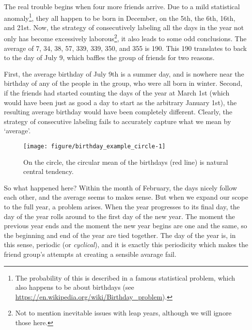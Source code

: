 \documentclass[12pt, a4paper]{book}\usepackage[]{graphicx}\usepackage[]{color}
\makeatletter
\def\maxwidth{ %
  \ifdim\Gin@nat@width>\linewidth
    \linewidth
  \else
    \Gin@nat@width
  \fi
}
\newenvironment{knitrout}{}{} %
\makeatother
\begin{document}
The real trouble begins when four more friends arrive. Due to a mild statistical anomaly\footnote{The probability of this is described in a famous statistical problem, which also happens to be about birthdays (see \url{https://en.wikipedia.org/wiki/Birthday_problem}).}, they all happen to be born in December, on the 5th, the 6th,  16th, and 21st. Now, the strategy of consecutively labeling all the days in the year not only has become excessively laborous\footnote{Not to mention inevitable issues with leap years, although we will ignore those here.}, it also leads to some odd conclusions. The average of 7, 34, 38, 57, 339, 339, 350, and 355 is 190. This 190 translates to back to the day of July 9, which baffles the group of friends for two reasons.

First, the average birthday of July 9th is a summer day, and is nowhere near the birthday of any of the people in the group, who were all born in winter. Second, if the friends had started counting the days of the year at March 1st (which would have been just as good a day to start as the arbitrary January 1st), the resulting average birthday would have been completely different. Clearly, the strategy of consecutive labeling fails to accurately capture what we mean by `average'.

\begin{figure}
\begin{knitrout}
\color{fgcolor}
\texttt{[image: figure/birthday\_example\_circle-1]} 

\end{knitrout}
\caption{On the circle, the circular mean of the birthdays (red line) is natural central tendency.}
\label{birthday_example_circle}
\end{figure}



So what happened here? Within the month of February, the days nicely follow each other, and the average seems to makes sense. But when we expand our scope to the full year, a problem arises. When the year progresses to its final day, the day of the year rolls around to the first day of the new year. The moment the previous year ends and the moment the new year begins are one and the same, so the beginning and end of the year are tied together. The day of the year is, in this sense, periodic (or \textit{cyclical}), and it is exactly this periodicity which makes the friend group's attempts at creating a sensible avarage fail.
\end{document}
